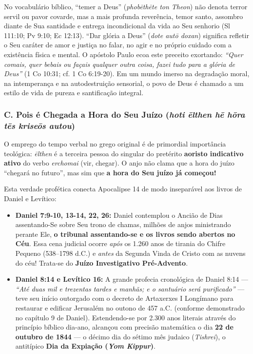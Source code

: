 \documentclass[11pt,a4paper,openany]{book}
\begin{document}
No vocabulário bíblico, ``temer a Deus'' (\textit{phobēthēte ton Theon}) não denota terror servil ou pavor covarde, mas a mais profunda reverência, temor santo, assombro diante de Sua santidade e entrega incondicional da vida ao Seu senhorio (Sl 111:10; Pv 9:10; Ec 12:13). ``Dar glória a Deus'' (\textit{dote autō doxan}) significa refletir o Seu caráter de amor e justiça no falar, no agir e no próprio cuidado com a existência física e mental. O apóstolo Paulo ecoa este preceito exortando: \textit{``Quer comais, quer bebais ou façais qualquer outra coisa, fazei tudo para a glória de Deus''} (1 Co 10:31; cf. 1 Co 6:19-20). Em um mundo imerso na degradação moral, na intemperança e na autodestruição sensorial, o povo de Deus é chamado a um estilo de vida de pureza e santificação integral.


\subsubsection*{C. Pois é Chegada a Hora do Seu Juízo (\textit{hoti ēlthen hē hōra tēs kriseōs autou})}

O emprego do tempo verbal no grego original é de primordial importância teológica: \textit{ēlthen} é a terceira pessoa do singular do pretérito \textbf{aoristo indicativo ativo} do verbo \textit{erchomai} (vir, chegar). O anjo não clama que a hora do juízo ``chegará no futuro'', mas sim que \textbf{a hora do Seu juízo já começou!}

Esta verdade profética conecta Apocalipse 14 de modo inseparável aos livros de Daniel e Levítico:
\begin{itemize}
  \item \textbf{Daniel 7:9-10, 13-14, 22, 26:} Daniel contemplou o Ancião de Dias assentando-Se sobre Seu trono de chamas, milhões de anjos ministrando perante Ele, \textbf{o tribunal assentando-se e os livros sendo abertos no Céu}. Essa cena judicial ocorre \textit{após} os 1.260 anos de tirania do Chifre Pequeno (538–1798 d.C.) e \textit{antes} da Segunda Vinda de Cristo com as nuvens do céu! Trata-se do \textbf{Juízo Investigativo Pré-Advento}.
  \item \textbf{Daniel 8:14 e Levítico 16:} A grande profecia cronológica de Daniel 8:14 — \textit{``Até duas mil e trezentas tardes e manhãs; e o santuário será purificado''} — teve seu início outorgado com o decreto de Artaxerxes I Longímano para restaurar e edificar Jerusalém no outono de 457 a.C. (conforme demonstrado no capítulo 9 de Daniel). Estendendo-se por 2.300 anos literais através do princípio bíblico dia-ano, alcançou com precisão matemática o dia \textbf{22 de outubro de 1844} — o décimo dia do sétimo mês judaico (\textit{Tishrei}), o antitípico \textbf{Dia da Expiação (\textit{Yom Kippur})}.
\end{itemize}
\end{document}
